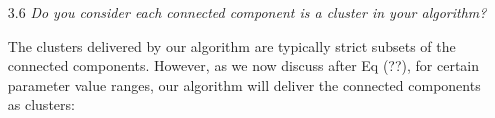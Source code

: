 \documentclass[11pt,onecolumn]{IEEEtran}
\begin{document}
\begin{enumerate}
\vspace*{2mm}

......

\vspace*{3mm} 

\item[3.6] {\em  Do you consider each connected component is a cluster in your algorithm?}

\vspace*{2mm}
The clusters delivered by our algorithm are typically strict subsets of the connected components. However, 
as we now discuss after Eq (??), for certain parameter value ranges, our algorithm will deliver the connected 
components as clusters: 
\vspace*{3mm} 


\end{enumerate} 



\vspace{5mm}


% 
%



\end{document}
